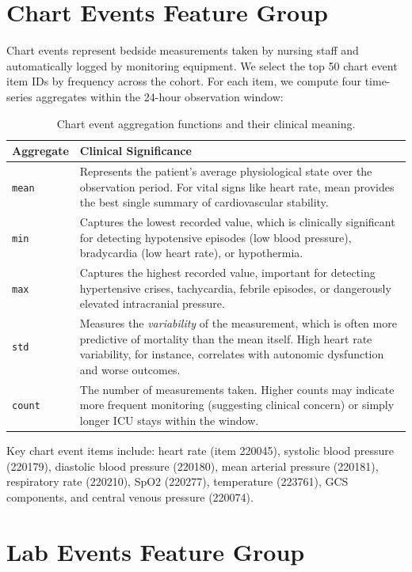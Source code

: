 \documentclass[11pt,a4paper]{report}
\begin{document}
\section{Chart Events Feature Group}

Chart events represent bedside measurements taken by nursing staff and automatically logged by monitoring equipment. We select the top 50 chart event item IDs by frequency across the cohort. For each item, we compute four time-series aggregates within the 24-hour observation window:

\begin{table}[H]
\centering
\caption{Chart event aggregation functions and their clinical meaning.}
\label{tab:chart_agg}
\begin{tabular}{lp{10cm}}
\toprule
\textbf{Aggregate} & \textbf{Clinical Significance} \\
\midrule
\texttt{mean} & Represents the patient's average physiological state over the observation period. For vital signs like heart rate, mean provides the best single summary of cardiovascular stability. \\
\texttt{min} & Captures the lowest recorded value, which is clinically significant for detecting hypotensive episodes (low blood pressure), bradycardia (low heart rate), or hypothermia. \\
\texttt{max} & Captures the highest recorded value, important for detecting hypertensive crises, tachycardia, febrile episodes, or dangerously elevated intracranial pressure. \\
\texttt{std} & Measures the \emph{variability} of the measurement, which is often more predictive of mortality than the mean itself. High heart rate variability, for instance, correlates with autonomic dysfunction and worse outcomes. \\
\texttt{count} & The number of measurements taken. Higher counts may indicate more frequent monitoring (suggesting clinical concern) or simply longer ICU stays within the window. \\
\bottomrule
\end{tabular}
\end{table}

Key chart event items include: heart rate (item 220045), systolic blood pressure (220179), diastolic blood pressure (220180), mean arterial pressure (220181), respiratory rate (220210), SpO2 (220277), temperature (223761), GCS components, and central venous pressure (220074).

\section{Lab Events Feature Group}
\end{document}
